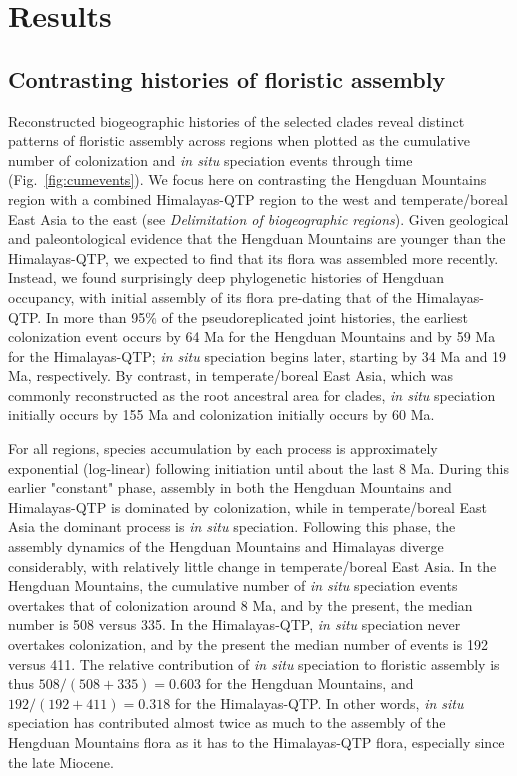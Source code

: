 \documentclass[9pt,twocolumn,twoside,lineno]{pnas-new}
\begin{document}
\section*{Results}

\subsection*{Contrasting histories of floristic assembly}

Reconstructed biogeographic histories of the selected clades reveal
distinct patterns of floristic assembly across regions when plotted as
the cumulative number of colonization and \textit{in situ} speciation
events through time (Fig.~\ref{fig:cumevents}). We focus here on
contrasting the Hengduan Mountains region with a combined
Himalayas-QTP region to the west and temperate/boreal East Asia to the
east (see \textit{Delimitation of biogeographic regions}). Given
geological and paleontological evidence that the Hengduan Mountains
are younger than the Himalayas-QTP, we expected to find that its flora
was assembled more recently. Instead, we found surprisingly deep
phylogenetic histories of Hengduan occupancy, with initial assembly of
its flora pre-dating that of the Himalayas-QTP. In more than 95\% of
the pseudoreplicated joint histories, the earliest colonization event
occurs by 64 Ma for the Hengduan Mountains and by 59 Ma for the
Himalayas-QTP; \textit{in situ} speciation begins later, starting by
34 Ma and 19 Ma, respectively. By contrast, in temperate/boreal East
Asia, which was commonly reconstructed as the root ancestral area for
clades, \textit{in situ} speciation initially occurs by 155 Ma and
colonization initially occurs by 60 Ma.

For all regions, species accumulation by each process is approximately
exponential (log-linear) following initiation until about the last 8
Ma. During this earlier "constant" phase, assembly in both the
Hengduan Mountains and Himalayas-QTP is dominated by colonization,
while in temperate/boreal East Asia the dominant process is \textit{in
  situ} speciation. Following this phase, the assembly dynamics of the
Hengduan Mountains and Himalayas diverge considerably, with relatively
little change in temperate/boreal East Asia. In the Hengduan
Mountains, the cumulative number of \textit{in situ} speciation events
overtakes that of colonization around 8 Ma, and by the present, the
median number is 508 versus 335. In the Himalayas-QTP, \textit{in
  situ} speciation never overtakes colonization, and by the present
the median number of events is 192 versus 411. The relative
contribution of \textit{in situ} speciation to floristic assembly is
thus $508/(508+335) = 0.603$ for the Hengduan Mountains, and
$192/(192+411) = 0.318$ for the Himalayas-QTP. In other words,
\textit{in situ} speciation has contributed almost twice as much to
the assembly of the Hengduan Mountains flora as it has to the
Himalayas-QTP flora, especially since the late Miocene.
\end{document}
